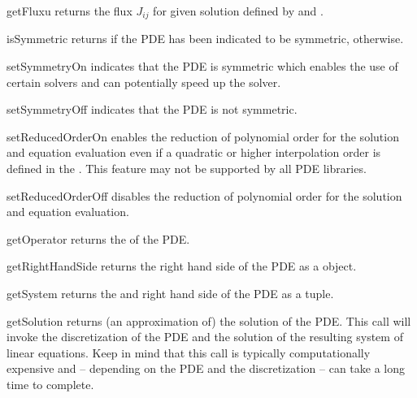 \begin{methoddesc}[LinearPDE]{getFlux}{u}
returns the flux $J_{ij}$ for given solution  defined by
 and .
\end{methoddesc}

\begin{methoddesc}[LinearPDE]{isSymmetric}{}
returns \True if the PDE has been indicated to be symmetric, \False otherwise.
\end{methoddesc}

\begin{methoddesc}[LinearPDE]{setSymmetryOn}{}
indicates that the PDE is symmetric which enables the use of certain solvers
and can potentially speed up the solver.
\end{methoddesc}

\begin{methoddesc}[LinearPDE]{setSymmetryOff}{}
indicates that the PDE is not symmetric.
\end{methoddesc}

\begin{methoddesc}[LinearPDE]{setReducedOrderOn}{}
enables the reduction of polynomial order for the solution and equation
evaluation even if a quadratic or higher interpolation order is defined in the
\Domain. This feature may not be supported by all PDE libraries.
\end{methoddesc}

\begin{methoddesc}[LinearPDE]{setReducedOrderOff}{}
disables the reduction of polynomial order for the solution and equation evaluation.
\end{methoddesc}

\begin{methoddesc}[LinearPDE]{getOperator}{}
returns the \Operator of the PDE.
\end{methoddesc}

\begin{methoddesc}[LinearPDE]{getRightHandSide}{}
returns the right hand side of the PDE as a \Data object.
\end{methoddesc}

\begin{methoddesc}[LinearPDE]{getSystem}{}
returns the \Operator and right hand side of the PDE as a tuple.
\end{methoddesc}

\begin{methoddesc}[LinearPDE]{getSolution}{}
returns (an approximation of) the solution of the PDE. This call will invoke
the discretization of the PDE and the solution of the resulting system of
linear equations. Keep in mind that this call is typically computationally
expensive and -- depending on the PDE and the discretization -- can take a
long time to complete. 
\end{methoddesc}

